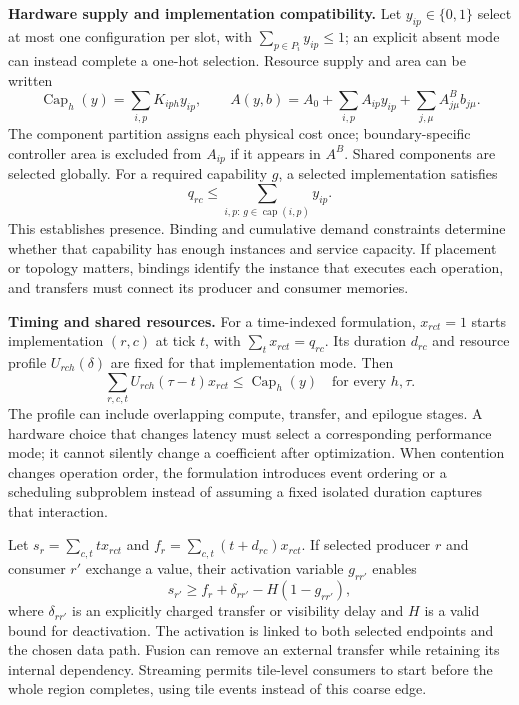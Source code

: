 \textbf{Hardware supply and implementation compatibility.}
Let $y_{ip}\in\{0,1\}$ select at most one configuration per slot, with $\sum_{p\in P_i}y_{ip}\le1$; an explicit absent mode can instead complete a one-hot selection. Resource supply and area can be written
\begin{equation}
 \operatorname{Cap}_h(y)=\sum_{i,p}K_{iph}y_{ip},\qquad
 A(y,b)=A_0+\sum_{i,p}A_{ip}y_{ip}+\sum_{j,\mu}A^{B}_{j\mu}b_{j\mu}.
 \label{eq:supply}
\end{equation}
The component partition assigns each physical cost once; boundary-specific controller area is excluded from $A_{ip}$ if it appears in $A^B$. Shared components are selected globally. For a required capability $g$, a selected implementation satisfies
\begin{equation}
 q_{rc}\le\sum_{i,p:\,g\in\operatorname{cap}(i,p)}y_{ip}.\label{eq:capability}
\end{equation}
This establishes presence. Binding and cumulative demand constraints determine whether that capability has enough instances and service capacity. If placement or topology matters, bindings identify the instance that executes each operation, and transfers must connect its producer and consumer memories.

\textbf{Timing and shared resources.}
For a time-indexed formulation, $x_{rct}=1$ starts implementation $(r,c)$ at tick $t$, with $\sum_t x_{rct}=q_{rc}$. Its duration $d_{rc}$ and resource profile $U_{rch}(\delta)$ are fixed for that implementation mode. Then
\begin{equation}
 \sum_{r,c,t}U_{rch}(\tau-t)x_{rct}
 \le \operatorname{Cap}_h(y) \quad\text{for every }h,\tau.\label{eq:resource}
\end{equation}
The profile can include overlapping compute, transfer, and epilogue stages. A hardware choice that changes latency must select a corresponding performance mode; it cannot silently change a coefficient after optimization. When contention changes operation order, the formulation introduces event ordering or a scheduling subproblem instead of assuming a fixed isolated duration captures that interaction.

Let $s_r=\sum_{c,t}t x_{rct}$ and $f_r=\sum_{c,t}(t+d_{rc})x_{rct}$. If selected producer $r$ and consumer $r'$ exchange a value, their activation variable $g_{rr'}$ enables
\begin{equation}
 s_{r'}\ge f_r+\delta_{rr'}-H(1-g_{rr'}),\label{eq:precedence}
\end{equation}
where $\delta_{rr'}$ is an explicitly charged transfer or visibility delay and $H$ is a valid bound for deactivation. The activation is linked to both selected endpoints and the chosen data path. Fusion can remove an external transfer while retaining its internal dependency. Streaming permits tile-level consumers to start before the whole region completes, using tile events instead of this coarse edge.


